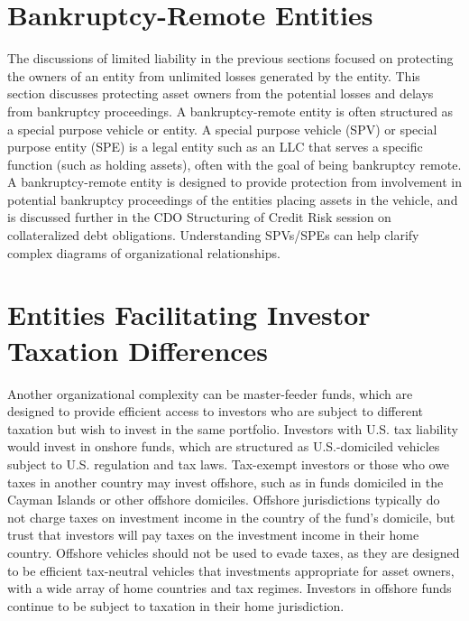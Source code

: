\documentclass[11pt]{article}
\begin{document}
\section*{Bankruptcy-Remote Entities}
The discussions of limited liability in the previous sections focused on protecting the owners of an entity from unlimited losses generated by the entity. This section discusses protecting asset owners from the potential losses and delays from bankruptcy proceedings. A bankruptcy-remote entity is often structured as a special purpose vehicle or entity. A special purpose vehicle (SPV) or special purpose entity (SPE) is a legal entity such as an LLC that serves a specific function (such as holding assets), often with the goal of being bankruptcy remote. A bankruptcy-remote entity is designed to provide protection from involvement in potential bankruptcy proceedings of the entities placing assets in the vehicle, and is discussed further in the CDO Structuring of Credit Risk session on collateralized debt obligations. Understanding SPVs/SPEs can help clarify complex diagrams of organizational relationships.

\section*{Entities Facilitating Investor Taxation Differences}
Another organizational complexity can be master-feeder funds, which are designed to provide efficient access to investors who are subject to different taxation but wish to invest in the same portfolio. Investors with U.S. tax liability would invest in onshore funds, which are structured as U.S.-domiciled vehicles subject to U.S. regulation and tax laws. Tax-exempt investors or those who owe taxes in another country may invest offshore, such as in funds domiciled in the Cayman Islands or other offshore domiciles. Offshore jurisdictions typically do not charge taxes on investment income in the country of the fund's domicile, but trust that investors will pay taxes on the investment income in their home country. Offshore vehicles should not be used to evade taxes, as they are designed to be efficient tax-neutral vehicles that investments appropriate for asset owners, with a wide array of home countries and tax regimes. Investors in offshore funds continue to be subject to taxation in their home jurisdiction.
\end{document}
